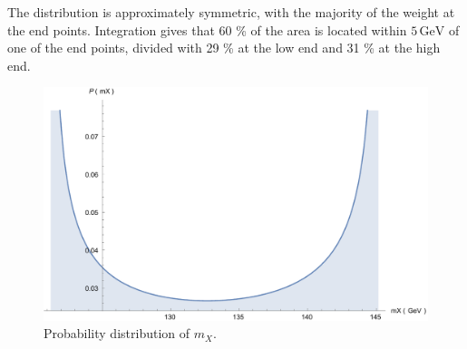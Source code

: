 \documentclass[twoside,english]{uiofysmaster}
\begin{document}
The distribution is approximately symmetric, with the majority of the weight at the end points. Integration gives that 60 \% of the area is located within $5\,\mathrm{GeV}$ of one of the end points, divided with 29 \% at the low end and 31 \% at the high end.
\begin{figure}[hbt]
\centering
\includegraphics[scale=0.6]{figures/appendix/mX-distribution.pdf}
\caption{Probability distribution of $m_X$.}
\label{fig:mX-dist}
\end{figure}












\end{document}
